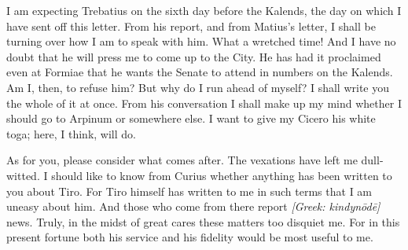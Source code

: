

 I am expecting Trebatius on the sixth day before the Kalends, the day on which I have sent off this letter. From his report, and from Matius's letter, I shall be turning over how I am to speak with him. What a wretched time! And I have no doubt that he will press me to come up to the City. He has had it proclaimed even at Formiae that he wants the Senate to attend in numbers on the Kalends. Am I, then, to refuse him? But why do I run ahead of myself? I shall write you the whole of it at once. From his conversation I shall make up my mind whether I should go to Arpinum or somewhere else. I want to give my Cicero his white toga; here, I think, will do.

 As for you, please consider what comes after. The vexations have left me dull-witted. I should like to know from Curius whether anything has been written to you about Tiro. For Tiro himself has written to me in such terms that I am uneasy about him. And those who come from there report \textit{[Greek: kindyn\=od\=e]} news. Truly, in the midst of great cares these matters too disquiet me. For in this present fortune both his service and his fidelity would be most useful to me.
